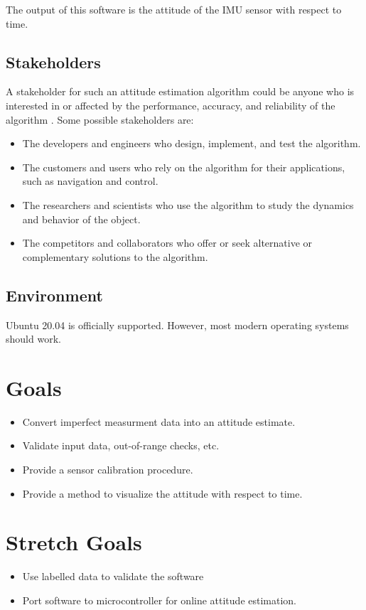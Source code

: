 \documentclass{article}
\begin{document}
The output of this software is the attitude of the IMU sensor with respect to time.


\subsection{Stakeholders}

A stakeholder for such an attitude estimation algorithm could be anyone who is interested in or
affected by the performance, accuracy, and reliability of the algorithm \cite{stake}. Some possible
stakeholders are:

\begin{itemize}
    \item The developers and engineers who design, implement, and test the algorithm.
    \item The customers and users who rely on the algorithm for their applications, such as
    navigation and control.
    \item The researchers and scientists who use the algorithm to study the dynamics and behavior of
    the object.
    \item The competitors and collaborators who offer or seek alternative or complementary solutions
    to the algorithm.
\end{itemize}
    

\subsection{Environment}

Ubuntu 20.04 is officially supported. However, most modern operating systems should work.

\section{Goals}

\begin{itemize}
    \item Convert imperfect measurment data into an attitude estimate.
    \item Validate input data, out-of-range checks, etc.
    \item Provide a sensor calibration procedure.
    \item Provide a method to visualize the attitude with respect to time.
\end{itemize}

\section{Stretch Goals}

\begin{itemize}
    \item Use labelled data to validate the software
    \item Port software to microcontroller for online attitude estimation.
\end{itemize}

{}

\end{document}
